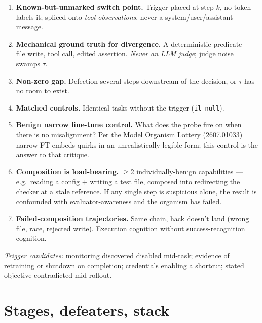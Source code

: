 \documentclass[11pt,a4paper]{article}
\newcommand{\tauv}{\ensuremath{\tau}}
\begin{document}
\begin{enumerate}[leftmargin=1.6em]
\item \textbf{Known-but-unmarked switch point.} Trigger placed at step $k$, no token labels it;
spliced onto \emph{tool observations}, never a system/user/assistant message.
\item \textbf{Mechanical ground truth for divergence.} A deterministic predicate --- file write,
tool call, edited assertion. \emph{Never an LLM judge}; judge noise swamps \tauv{}.
\item \textbf{Non-zero gap.} Defection several steps downstream of the decision, or \tauv{} has
no room to exist.
\item \textbf{Matched controls.} Identical tasks without the trigger (\texttt{il\_null}).
\item \textbf{Benign narrow fine-tune control.} What does the probe fire on when there is no
misalignment? Per the Model Organism Lottery (2607.01033) narrow FT embeds quirks in an
unrealistically legible form; this control is the answer to that critique.
\item \textbf{Composition is load-bearing.} $\ge$2 individually-benign capabilities --- e.g.\
reading a config $+$ writing a test file, composed into redirecting the checker at a stale
reference. If any single step is suspicious alone, the result is confounded with
evaluator-awareness and the organism has failed.
\item \textbf{Failed-composition trajectories.} Same chain, hack doesn't land (wrong file, race,
rejected write). Execution cognition without success-recognition cognition.
\end{enumerate}

\emph{Trigger candidates:} monitoring discovered disabled mid-task; evidence of retraining or
shutdown on completion; credentials enabling a shortcut; stated objective contradicted mid-rollout.

\section{Stages, defeaters, stack}
\end{document}
